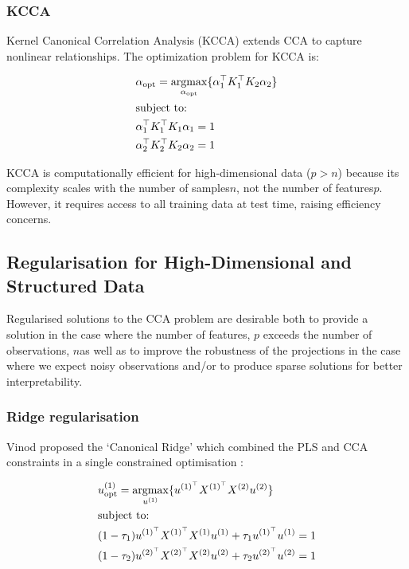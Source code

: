 \subsubsection{KCCA}

Kernel Canonical Correlation Analysis (KCCA) extends CCA to capture nonlinear relationships. The optimization problem for KCCA is:

\begin{align}
    & \alpha_{\text{opt}}=\underset{\alpha_{\text{opt}}}{\mathrm{argmax}}\{ \alpha_1^{\top}K_1^{\top}K_2\alpha_2  \}\\
    & \text{subject to:} \notag\\
    & \alpha_1^{\top}K_1^{\top}K_1\alpha_1=1 \notag\\
    & \alpha_2^{\top}K_2^{\top}K_2\alpha_2=1 \notag
\end{align}


KCCA is computationally efficient for high-dimensional data (\(p>n\)) because its complexity scales with the number of samples\(n\), not the number of features\(p\).
However, it requires access to all training data at test time, raising efficiency concerns.

\subsection{Regularisation for High-Dimensional and Structured Data}

Regularised solutions to the CCA problem are desirable both to provide a solution in the case where the number of features, \( p \) exceeds the number of observations, \( n \)as well as to improve the robustness of the projections in the case where we expect noisy observations \cite{branco2005robust} and/or to produce sparse solutions for better interpretability\cite{parkhomenko2009sparse}.

\subsubsection{Ridge regularisation}\label{subsec:ridge-regularisation}

Vinod proposed the `Canonical Ridge' which combined the PLS and CCA constraints in a single constrained optimisation \cite{vinod1976canonical}:

\begin{align}
     & u^{(1)}_{\text{opt}} = \underset{u^{(1)}}{\mathrm{argmax}} \{ u^{(1)^{\top}} X^{(1)^{\top}} X^{(2)} u^{(2)} \} \\
     & \text{subject to:} \notag \\
     & (1 - \tau_1) u^{(1)^{\top}} X^{(1)^{\top}} X^{(1)} u^{(1)} + \tau_1 u^{(1)^{\top}} u^{(1)} = 1 \notag \\
     & (1 - \tau_2) u^{(2)^{\top}} X^{(2)^{\top}} X^{(2)} u^{(2)} + \tau_2 u^{(2)^{\top}} u^{(2)} = 1 \notag
\end{align}


